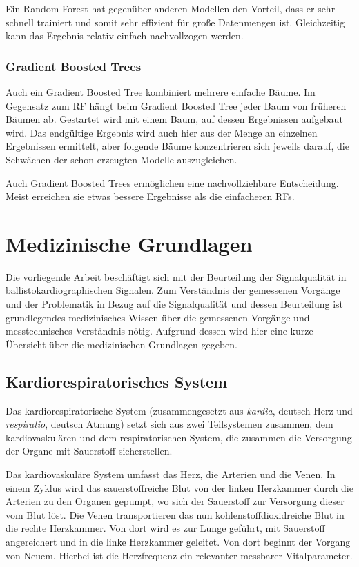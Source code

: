 		Ein Random Forest hat gegenüber anderen Modellen den Vorteil, dass er sehr schnell trainiert und somit sehr effizient für große Datenmengen ist. Gleichzeitig kann das Ergebnis relativ einfach nachvollzogen werden.
		
		\subsubsection{Gradient Boosted Trees}
		
		Auch ein Gradient Boosted Tree kombiniert mehrere einfache Bäume. Im Gegensatz zum \ac{RF} hängt beim Gradient Boosted Tree jeder Baum von früheren Bäumen ab. Gestartet wird mit einem Baum, auf dessen Ergebnissen aufgebaut wird. Das endgültige Ergebnis wird auch hier aus der Menge an einzelnen Ergebnissen ermittelt, aber folgende Bäume konzentrieren sich jeweils darauf, die Schwächen der schon erzeugten Modelle auszugleichen.
		
		Auch Gradient Boosted Trees ermöglichen eine nachvollziehbare Entscheidung. Meist erreichen sie etwas bessere Ergebnisse als die einfacheren \acl{RF}s.

\section{Medizinische Grundlagen}\label{med-grundlagen}

Die vorliegende Arbeit beschäftigt sich mit der Beurteilung der Signalqualität in ballistokardiographischen Signalen. Zum Verständnis der gemessenen Vorgänge und der Problematik in Bezug auf die Signalqualität und dessen Beurteilung ist grundlegendes medizinisches Wissen über die gemessenen Vorgänge und messtechnisches Verständnis nötig. Aufgrund dessen wird hier eine kurze Übersicht über die medizinischen Grundlagen gegeben.

	\subsection{Kardiorespiratorisches System}
	
	Das kardiorespiratorische System (zusammengesetzt aus \textit{kardìa}, deutsch \glq Herz\grq{} und \textit{respiratio}, deutsch \glq Atmung\grq) setzt sich aus zwei Teilsystemen zusammen, dem kardiovaskulären und dem respiratorischen System, die zusammen die Versorgung der Organe mit Sauerstoff sicherstellen.
	
	Das kardiovaskuläre System umfasst das Herz, die Arterien und die Venen. In einem Zyklus wird das sauerstoffreiche Blut von der linken Herzkammer durch die Arterien zu den Organen gepumpt, wo sich der Sauerstoff zur Versorgung dieser vom Blut löst. Die Venen transportieren das nun kohlenstoffdioxidreiche Blut in die rechte Herzkammer. Von dort wird es zur Lunge geführt, mit Sauerstoff angereichert und in die linke Herzkammer geleitet. Von dort beginnt der Vorgang von Neuem. Hierbei ist die Herzfrequenz ein relevanter messbarer Vitalparameter.
	
